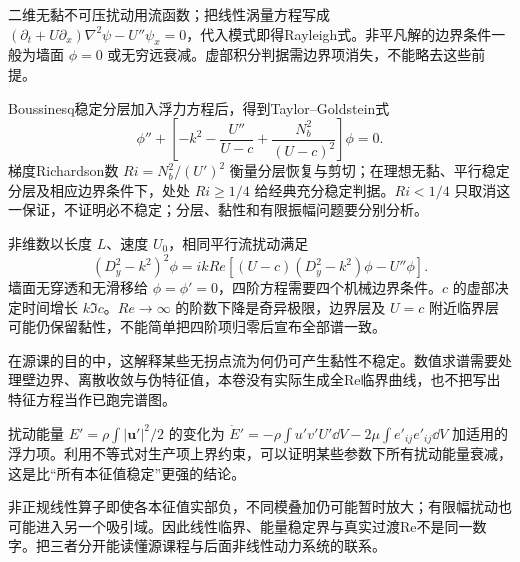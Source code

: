 二维无黏不可压扰动用流函数；把线性涡量方程写成 $(\partial_t+U\partial_x)\nabla^2\psi-U''\psi_x=0$，代入模式即得Rayleigh式。非平凡解的边界条件一般为墙面 $\phi=0$ 或无穷远衰减。虚部积分判据需边界项消失，不能略去这些前提。

Boussinesq稳定分层加入浮力方程后，得到Taylor--Goldstein式
\[
\phi''+\left[-k^2-\frac{U''}{U-c}+\frac{N_b^2}{(U-c)^2}\right]\phi=0.
\]
梯度Richardson数 $Ri=N_b^2/(U')^2$ 衡量分层恢复与剪切；在理想无黏、平行稳定分层及相应边界条件下，处处 $Ri\ge1/4$ 给经典充分稳定判据。$Ri<1/4$ 只取消这一保证，不证明必不稳定；分层、黏性和有限振幅问题要分别分析。

非维数以长度 $L$、速度 $U_0$，相同平行流扰动满足
\[
(D_y^2-k^2)^2\phi=ikRe[(U-c)(D_y^2-k^2)\phi-U''\phi].
\]
墙面无穿透和无滑移给 $\phi=\phi'=0$，四阶方程需要四个机械边界条件。$c$ 的虚部决定时间增长 $k\Im c$。$Re\to\infty$ 的阶数下降是奇异极限，边界层及 $U=c$ 附近临界层可能仍保留黏性，不能简单把四阶项归零后宣布全部谱一致。

在源课的目的中，这解释某些无拐点流为何仍可产生黏性不稳定。数值求谱需要处理壁边界、离散收敛与伪特征值，本卷没有实际生成全Re临界曲线，也不把写出特征方程当作已跑完谱图。

扰动能量 $E'=\rho\int|\mathbf u'|^2/2$ 的变化为 $\dot E'=-\rho\int u'v'U'\dd V-2\mu\int e'_{ij}e'_{ij}\dd V$ 加适用的浮力项。利用不等式对生产项上界约束，可以证明某些参数下所有扰动能量衰减，这是比“所有本征值稳定”更强的结论。

非正规线性算子即使各本征值实部负，不同模叠加仍可能暂时放大；有限幅扰动也可能进入另一个吸引域。因此线性临界、能量稳定界与真实过渡Re不是同一数字。把三者分开能读懂源课程与后面非线性动力系统的联系。
